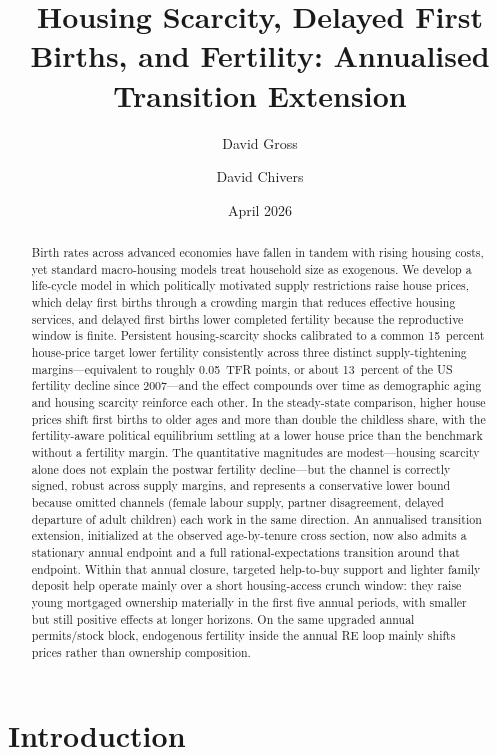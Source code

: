 \documentclass[11pt]{article}
\title{Housing Scarcity, Delayed First Births, and Fertility: Annualised Transition Extension}
\author{David Gross \and David Chivers}
\date{April 2026}
\begin{document}
\maketitle

\begin{abstract}
Birth rates across advanced economies have fallen in tandem with rising housing costs, yet
standard macro-housing models treat household size as exogenous. We develop a life-cycle
model in which politically motivated supply restrictions raise house prices, which delay
first births through a crowding margin that reduces effective housing services, and delayed
first births lower completed fertility because the reproductive window is finite.
Persistent housing-scarcity shocks calibrated to a common 15~percent house-price target
lower fertility consistently across three distinct supply-tightening margins---equivalent
to roughly 0.05~TFR points, or about 13~percent of the US fertility decline since
2007---and the effect compounds over time as demographic aging and housing scarcity
reinforce each other. In the steady-state comparison, higher house prices shift first
births to older ages and more than double the childless share, with the fertility-aware
political equilibrium settling at a lower house price than the benchmark without a
fertility margin. The quantitative magnitudes are modest---housing scarcity alone does not
explain the postwar fertility decline---but the channel is correctly signed, robust across
supply margins, and represents a conservative lower bound because omitted channels
(female labour supply, partner disagreement, delayed departure of adult children) each
work in the same direction. An annualised transition extension, initialized at the observed
age-by-tenure cross section, now also admits a stationary annual endpoint and a full
rational-expectations transition around that endpoint. Within that annual closure, targeted
help-to-buy support and lighter family deposit help operate mainly over a short
housing-access crunch window: they raise young mortgaged ownership materially in the first
five annual periods, with smaller but still positive effects at longer horizons. On the same
upgraded annual permits/stock block, endogenous fertility inside the annual RE loop mainly
shifts prices rather than ownership composition.
\end{abstract}

\section{Introduction}
\end{document}

